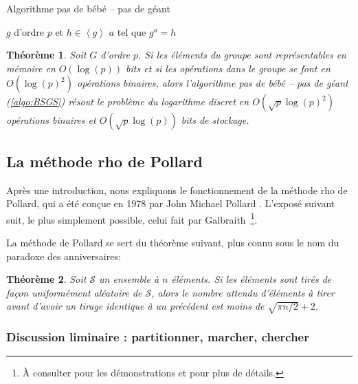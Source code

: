 \documentclass[a4paper, titlepage, 11pt]{article}
\newtheorem{theo}{Théorème}[section]
\theoremstyle{definition}
\theoremstyle{remark}
\def\O{O}
\def\gen #1{\left\langle#1\right\rangle}
\def\ceil #1{\left\lceil#1\right\rceil}
\begin{document}
\begin{algorithm}[h]
\caption{Algorithme pas de bébé -- pas de géant}
\label{algo:BSGS}
\begin{algorithmic}[1]
\REQUIRE $g$ d'ordre $p$ et $h \in \gen{g}$
\ENSURE $a$ tel que $g^a = h$
\STATE{$m \gets \ceil{\sqrt{p}}$}
\ENDFOR
{}
\ENDWHILE
{}
\end{algorithmic}
\end{algorithm}

\begin{theo}
Soit $G$ d'ordre $p$. Si les éléments du groupe sont représentables en mémoire en $\O(\log(p))$ bits et si les opérations dans le groupe se font en $\O(\log(p)^2)$ opérations binaires, alors l'algorithme pas de bébé -- pas de géant (\ref{algo:BSGS}) résout le problème du logarithme discret en $\O(\sqrt{p}\log(p)^2)$ opérations binaires et $\O(\sqrt{p}\log(p))$ bits de stockage.
\end{theo}

\subsection{La méthode rho de Pollard}\label{s-sec:rho}

Après une introduction, nous expliquons le fonctionnement de la méthode rho de Pollard, qui a été conçue en 1978 par John Michael Pollard \cite{pollard1978}.
L'exposé suivant suit, le plus simplement possible, celui fait par Galbraith~\cite[section 14, p. 264]{galbraith2012}\footnote{\`A consulter pour les démonstrations et pour plus de détails.}.

La méthode de Pollard se sert du théorème suivant, plus connu sous le nom du paradoxe des anniversaires:
\begin{theo}\label{paradoxeAnniversaire}
Soit $\mathcal S$ un ensemble à $n$ éléments. Si les éléments sont tirés de façon uniformément aléatoire de $\mathcal S$, alors le nombre attendu d'éléments à tirer avant d'avoir un tirage identique à un précédent est moins de $\sqrt{\pi n /2} + 2$.
\end{theo}

\subsubsection{Discussion liminaire : partitionner, marcher, chercher}
\end{document}
